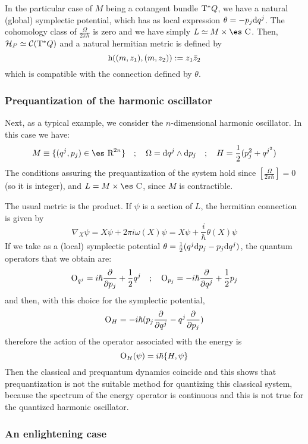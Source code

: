 \documentclass[12pt]{article}
\theoremstyle{plain}
\def\derpar#1#2{\frac{\partial{#1}}{\partial{#2}}}
\def\d{{\rm d}}
\def\C{{\cal C}}
\def\H{{\cal H}}
\def\Op{{\rm O}}
\def\h{{\rm h}}
\def\Real{\mbox{\es R}}
\def\Complex{\mbox{\es C}}
\def\Tan{{\rm T}}
\begin{document}
In the particular case of $M$ being a cotangent bundle $\Tan^*Q$,
we have a natural (global) symplectic potential,
which has as local expression
$\theta = -p_j\d q^j$.
The cohomology class of $\frac{\Omega}{2\pi\hbar}$ is zero and we have
simply
$L \simeq M \times \Complex$.
Then, $\H_P \simeq \C (\Tan^*Q)$
and a natural hermitian metric is defined by
$$
\h ((m,z_1),(m,z_2)) := z_1 \bar z_2
$$
which is compatible with the connection defined by $\theta$.


\subsubsection{Prequantization of the harmonic oscillator}


Next, as a typical example, we consider
the $n$-dimensional harmonic oscillator. In this case we have:
$$
M \equiv \{ (q^j,p_j) \in \Real^{2n} \}
\quad ; \quad
\Omega = \d q^j \wedge \d p_j
\quad ; \quad
H = \frac{1}{2}(p_j^2 + q^{j^2})
$$
The conditions assuring the prequantization of the system hold since
$[\frac{\Omega}{2\pi\hbar}]=0$ (so it is integer), and
$L = M \times \Complex$, since $M$ is contractible.

The usual metric is the product.
If $\psi$ is a section of $L$,
the hermitian connection is given by
$$
\nabla_X\psi = X\psi + 2\pi i \omega (X) \psi =
X\psi + \frac{i}{\hbar} \theta (X) \psi
$$
If we take as a (local) symplectic potential
$\theta = \frac{1}{2}(q^j\d p_j -p_j\d q^j)$,
the quantum operators that we obtain are:
$$
\Op_{q^j} = i\hbar \derpar{}{p_j} + \frac{1}{2} q^j
\quad ; \quad
\Op_{p_j} = -i\hbar \derpar{}{q^j} + \frac{1}{2} p_j
$$
and then, with this choice for the symplectic potential,
$$
\Op_H = -i\hbar (p_j\derpar{}{q^j} - q^j\derpar{}{p_j})
$$
therefore the action of the operator associated with the energy is
$$
\Op_H (\psi ) = i\hbar \{ H,\psi \}
$$
Then the classical and prequantum dynamics coincide
and this shows that prequantization is not
the suitable method for quantizing this classical system,
because the spectrum of the energy operator is continuous
and this is not true for the quantized harmonic oscillator.


\subsubsection{An enlightening case}
\end{document}

